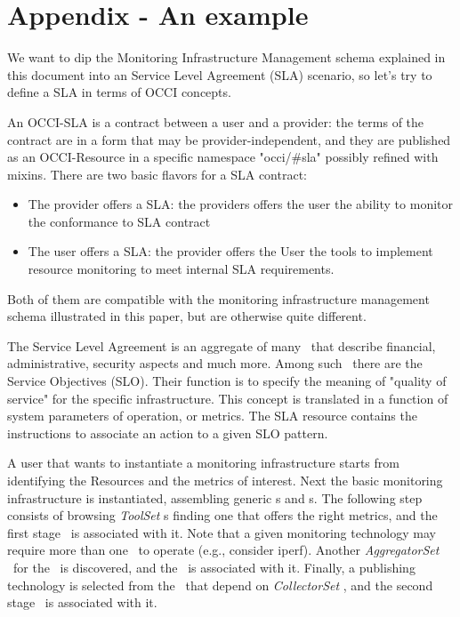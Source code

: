 \documentclass[12pt]{article}  %
\begin{document}
\appendix

\section*{Appendix - An example}

We want to dip the Monitoring Infrastructure Management schema explained in this document into an Service Level Agreement (SLA) scenario, so let's try to define a SLA in terms of OCCI concepts.

An OCCI-SLA is a contract between a user and a provider: the terms of the contract are in a form that may be provider-independent, and they are published as an OCCI-Resource in a specific namespace "occi/\#sla" possibly refined with mixins. There are two basic flavors for a SLA contract:

\begin{itemize} 
\item The provider offers a SLA: the providers offers the user the ability to monitor the conformance to SLA contract
\item The user offers a SLA: the provider offers the User the tools to implement resource monitoring to meet internal SLA requirements.
\end{itemize}

Both of them are compatible with the monitoring infrastructure management schema illustrated in this paper, but are otherwise quite different.

The Service Level Agreement is an aggregate of many \rs\, that describe financial, administrative, security aspects and much more. Among such \rs\, there are the Service  Objectives (SLO). Their function is to specify the meaning of "quality of service" for the specific infrastructure. This concept is translated in a function of system parameters of operation, or metrics.
 The SLA resource contains the instructions to associate an action to a given SLO pattern.

A user that wants to instantiate a monitoring infrastructure starts from identifying the Resources and the metrics of interest. Next the basic monitoring infrastructure is instantiated, assembling generic \sens s and \coll s. The following step consists of browsing {\em ToolSet} \mi s finding one that offers the right metrics, and the first stage \coll\ is associated with it. Note that a given monitoring technology may require more than one \coll\ to operate (e.g., consider iperf). Another {\em AggregatorSet} \mi\ for the \sens\ is discovered, and the \sens\ is associated with it. Finally, a publishing technology is selected from the \mi\ that depend on {\em CollectorSet} \mi , and the second stage \coll\ is associated with it.
\end{document}
